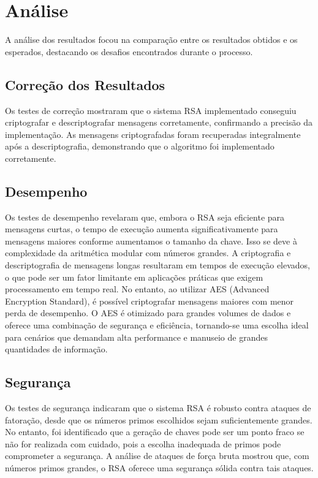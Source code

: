 \documentclass[a4paper,12pt]{article}
\begin{document}
\section*{Análise}
A análise dos resultados focou na comparação entre os resultados obtidos e os esperados, destacando os desafios encontrados durante o processo.

\subsection*{Correção dos Resultados}
Os testes de correção mostraram que o sistema RSA implementado conseguiu criptografar e descriptografar mensagens corretamente, confirmando a precisão da implementação. As mensagens criptografadas foram recuperadas integralmente após a descriptografia, demonstrando que o algoritmo foi implementado corretamente.

\subsection*{Desempenho}
Os testes de desempenho revelaram que, embora o RSA seja eficiente para mensagens curtas, o tempo de execução aumenta significativamente para mensagens maiores conforme aumentamos o tamanho da chave. Isso se deve à complexidade da aritmética modular com números grandes. A criptografia e descriptografia de mensagens longas resultaram em tempos de execução elevados, o que pode ser um fator limitante em aplicações práticas que exigem processamento em tempo real. No entanto, ao utilizar AES (Advanced Encryption Standard), é possível criptografar mensagens maiores com menor perda de desempenho. O AES é otimizado para grandes volumes de dados e oferece uma combinação de segurança e eficiência, tornando-se uma escolha ideal para cenários que demandam alta performance e manuseio de grandes quantidades de informação.

\subsection*{Segurança}
Os testes de segurança indicaram que o sistema RSA é robusto contra ataques de fatoração, desde que os números primos escolhidos sejam suficientemente grandes. No entanto, foi identificado que a geração de chaves pode ser um ponto fraco se não for realizada com cuidado, pois a escolha inadequada de primos pode comprometer a segurança. A análise de ataques de força bruta mostrou que, com números primos grandes, o RSA oferece uma segurança sólida contra tais ataques.
\end{document}
